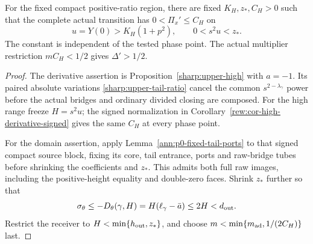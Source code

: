 \begin{lemma}
\label{ann:p0-paired-high-derivative}
For the fixed compact positive-ratio region, there are fixed
\(K_H,z_*,C_H>0\) such that the complete actual transition has
\(0<\Pi_x'\le C_H\) on
\[
 u=Y(0)>K_H(1+p^2),\qquad 0<s^2u<z_*.
\]
The constant is independent of the tested phase point. The actual
multiplier restriction \(mC_H<1/2\) gives \(\Delta'>1/2\).
\end{lemma}
\begin{proof}
The derivative assertion is Proposition~\ref{sharp:upper-high} with
\(a=-1\). Its paired absolute variations
\eqref{sharp:upper-tail-ratio} cancel the common
\(s^{2-\lambda_\gamma}\) power before the actual bridges and
ordinary divided closing are composed. For the high range freeze
\(H=s^2u\); the signed normalization in
Corollary~\ref{rew:cor-high-derivative-signed} gives the same
\(C_H\) at every phase point.

For the domain assertion, apply
Lemma~\ref{ann:p0-fixed-tail-ports} to that signed compact source
block, fixing its core, tail entrance, ports and raw-bridge tubes
before shrinking the coefficients and \(z_*\). This admits both
full raw images, including the positive-height equality and
double-zero faces. Shrink \(z_*\) further so that
\[
 \sigma_\theta\le-D_\theta(\gamma,H)
   =H(\ell_\gamma-\bar a)\le2H<d_{\rm out}.
\]
Restrict the receiver to \(H<\min\{h_{\rm out},z_*\}\), and
choose \(m<\min\{m_{\rm ad},1/(2C_H)\}\) last.
\end{proof}

